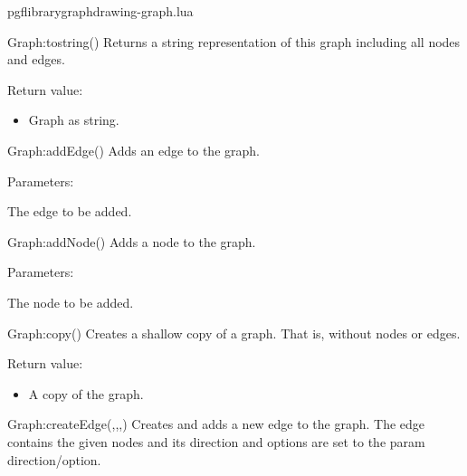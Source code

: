 
\begin{filedescription}{pgflibrarygraphdrawing-graph.lua}


\begin{luacommand}{{Graph:\textunderscore{}\textunderscore{}tostring}()}
Returns a string representation of this graph including all nodes and edges.


Return value:
\begin{itemize} \item[] Graph as string. \end{itemize}


\end{luacommand}\begin{luacommand}{{Graph:addEdge}()}
Adds an edge to the graph.

Parameters:
\begin{parameterdescription}
	\item[\meta{edge}] The edge to be added.
\end{parameterdescription}



\end{luacommand}\begin{luacommand}{{Graph:addNode}()}
Adds a node to the graph.

Parameters:
\begin{parameterdescription}
	\item[\meta{node}] The node to be added.
\end{parameterdescription}



\end{luacommand}\begin{luacommand}{{Graph:copy}()}
Creates a shallow copy of a graph. That is, without nodes or edges.


Return value:
\begin{itemize} \item[] A copy of the graph. \end{itemize}


\end{luacommand}\begin{luacommand}{{Graph:createEdge}(,,,)}
Creates and adds a new edge to the graph. The edge contains the given nodes and its direction and options are set to the param direction/option.


\end{luacommand}
\end{filedescription}
